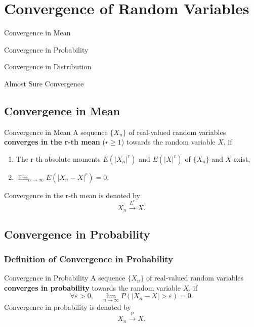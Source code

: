 \chapter{Convergence of Random Variables}

\begin{introduction}
    \item Convergence in Mean
    \item Convergence in Probability
    \item Convergence in Distribution
    \item Almost Sure Convergence
\end{introduction}

\section{Convergence in Mean}

\begin{definition}{Convergence in Mean}{}
    A sequence $\{X_n\}$ of real-valued random variables \textbf{converges in the r-th mean} ($r\geq1$) towards the random variable $X$, if
    \begin{enumerate}
        \item The r-th absolute moments $E(|X_n|^r)$ and $E(|X|^r)$ of $\{X_n\}$ and $X$ exist,
        \item $\lim_{n\to\infty}E\left(|X_n-X|^r\right)=0$.
    \end{enumerate}
    Convergence in the r-th mean is denoted by
    \begin{equation}
        X_n \stackrel{L^r}{\rightarrow} X.
    \end{equation}
\end{definition}

\section{Convergence in Probability}

\subsection{Definition of Convergence in Probability}

\begin{definition}{Convergence in Probability}{}
    A sequence $\{X_n\}$ of real-valued random variables \textbf{converges in probability} towards the random variable $X$, if
    \begin{equation}
        \forall\varepsilon>0,\quad\lim_{n\to\infty}P\left(|X_n-X|>\varepsilon\right)=0.
    \end{equation}
    Convergence in probability is denoted by
    \begin{equation}
        X_n \stackrel{p}{\rightarrow} X.
    \end{equation}
\end{definition}

